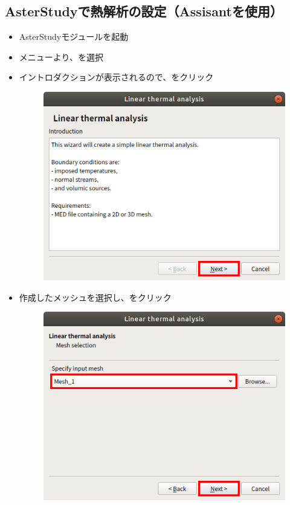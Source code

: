 \subsection{AsterStudyで熱解析の設定（Assisantを使用）}
\begin{itemize}
	\item AsterStudyモジュールを起動
	\item メニューより、を選択
	\item イントロダクションが表示されるので、をクリック
	      \begin{figure}[H]
		      \centering
		      \includegraphics{fig/Assisant_thermal_001.png}
	      \end{figure}
	      \clearpage
	\item 作成したメッシュを選択し、をクリック
	      \begin{figure}[H]
		      \centering
		      \includegraphics{fig/Assisant_thermal_002.png}

\end{figure}
\end{itemize}
